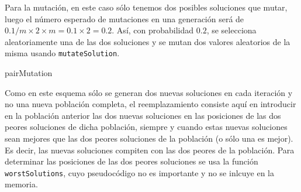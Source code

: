 \documentclass[10pt,a4paper]{article}
\begin{document}
Para la mutación, en este caso sólo tenemos dos posibles soluciones que mutar, luego el número esperado de mutaciones en una generación será de $0.1/m \times 2 \times m=0.1 \times 2 = 0.2$. Así, con probabilidad $ 0.2 $, se selecciona aleatoriamente una de las dos soluciones y se mutan dos valores aleatorios de la misma usando \lstinline|mutateSolution|.

\begin{algorithm}[H]
	\DontPrintSemicolon
	\caption{{\sc pairMutation} }
\end{algorithm}

Como en este esquema sólo se generan dos nuevas soluciones en cada iteración y no una nueva población completa, el reemplazamiento consiste aquí en introducir en la población anterior las dos nuevas soluciones en las posiciones de las dos peores soluciones de dicha población, siempre y cuando estas nuevas soluciones sean mejores que las dos peores soluciones de la población (o sólo una es mejor). Es decir, las nuevas soluciones compiten con las dos peores de la población. Para determinar las posiciones de las dos peores soluciones se usa la función \lstinline|worstSolutions|, cuyo pseudocódigo no es importante y no se inlcuye en la memoria. 
\end{document}

